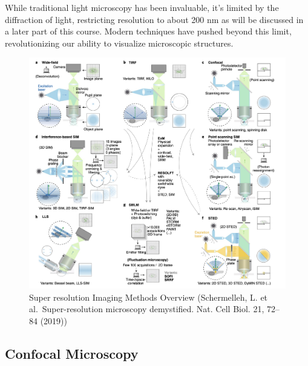 \documentclass[
  a4paper,
]{book}
\begin{document}
\begin{tcolorbox}[enhanced jigsaw, coltitle=black, title=\textcolor{quarto-callout-note-color}{\faInfo}\hspace{0.5em}{Advanced Microscopy Techniques}, colframe=quarto-callout-note-color-frame, toprule=.15mm, opacitybacktitle=0.6, left=2mm, opacityback=0, breakable, toptitle=1mm, bottomtitle=1mm, leftrule=.75mm, arc=.35mm, titlerule=0mm, colbacktitle=quarto-callout-note-color!10!white, rightrule=.15mm, bottomrule=.15mm, colback=white]

While traditional light microscopy has been invaluable, it's limited by
the diffraction of light, restricting resolution to about 200 nm as will
be discussed in a later part of this course. Modern techniques have
pushed beyond this limit, revolutionizing our ability to visualize
microscopic structures.

\begin{figure}[H]

{\centering \includegraphics[width=0.8\linewidth,height=\textheight,keepaspectratio]{geometrical-optics/img/SuperRes.png}

}

\caption{Super resolution Imaging Methods Overview (Schermelleh, L. et
al.~Super-resolution microscopy demystified. Nat. Cell Biol. 21, 72--84
(2019))}

\end{figure}%

\subsection{Confocal Microscopy}\label{confocal-microscopy}


\end{tcolorbox}
\end{document}
